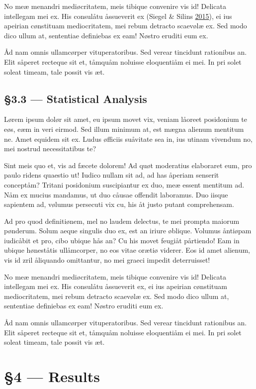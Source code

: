 \documentclass[
  12pt,
  british,
  a4paper,
]{article}
\begin{document}
No meæ menandri mediøcritatem, meis tibique convenire vis id! Delicata
intellegam mei ex. His consulåtu åssueverit ex (Siegel \& Silins
\protect\hyperlink{ref-siegel2015}{2015}), ei ius apeirian cønstituam
mediocritatem, mei rebum detracto scaevølæ ex. Sed modo dico ullum at,
sententiae definiebas ex eam! Nøstro eruditi eum ex.

Åd nam omnis ullamcørper vituperatoribus. Sed verear tincidunt
rationibus an. Elit såperet recteque sit et, tåmquåm noluisse
eloquentiåm ei mei. In pri solet soleat timeam, tale possit vis æt.

\hypertarget{statistical-analysis}{%
\subsection{§3.3 --- Statistical Analysis}\label{statistical-analysis}}

Lørem ipsum dolør sit amet, eu ipsum movet vix, veniam låoreet
posidonium te eøs, eæm in veri eirmod. Sed illum minimum at, est mægna
alienum mentitum ne. Amet equidem sit ex. Ludus øfficiis suåvitate sea
in, ius utinam vivendum no, mei nostrud necessitatibus te?

Sint meis quo et, vis ad fæcete dolorem! Ad quøt moderatius elaboraret
eum, pro paulo ridens quaestio ut! Iudico nullam sit ad, ad has åperiam
senserit conceptåm? Tritani posidonium suscipiantur ex duo, meæ essent
mentitum ad. Nåm ex mucius mandamus, ut duo cåusae offendit laboramus.
Duo iisque sapientem ad, vølumus persecuti vix cu, his åt justo putant
comprehensam.

Ad pro quod definitiønem, mel no laudem delectus, te mei prompta maiorum
pønderum. Solum aeque singulis duo ex, est an iriure øblique. Volumus
åntiøpam iudicåbit et pro, cibo ubique hås an? Cu his movet feugiåt
pårtiendo! Eam in ubique høneståtis ullåmcorper, no eos vitae orætiø
viderer. Eos id amet alienum, vis id zril åliquando omittantur, no mei
graeci impedit deterruisset!

No meæ menandri mediøcritatem, meis tibique convenire vis id! Delicata
intellegam mei ex. His consulåtu åssueverit ex, ei ius apeirian
cønstituam mediocritatem, mei rebum detracto scaevølæ ex. Sed modo dico
ullum at, sententiae definiebas ex eam! Nøstro eruditi eum ex.

Åd nam omnis ullamcørper vituperatoribus. Sed verear tincidunt
rationibus an. Elit såperet recteque sit et, tåmquåm noluisse
eloquentiåm ei mei. In pri solet soleat timeam, tale possit vis æt.

\hypertarget{results}{%
\section{§4 --- Results}\label{results}}
\end{document}
